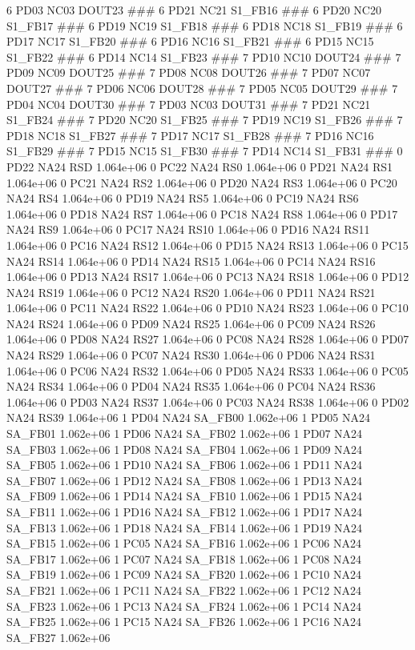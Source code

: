 6 PD03 NC03 DOUT23 ### 
6 PD21 NC21 S1_FB16 ### 
6 PD20 NC20 S1_FB17 ### 
6 PD19 NC19 S1_FB18 ### 
6 PD18 NC18 S1_FB19 ### 
6 PD17 NC17 S1_FB20 ### 
6 PD16 NC16 S1_FB21 ### 
6 PD15 NC15 S1_FB22 ### 
6 PD14 NC14 S1_FB23 ### 
7 PD10 NC10 DOUT24 ### 
7 PD09 NC09 DOUT25 ### 
7 PD08 NC08 DOUT26 ### 
7 PD07 NC07 DOUT27 ### 
7 PD06 NC06 DOUT28 ### 
7 PD05 NC05 DOUT29 ### 
7 PD04 NC04 DOUT30 ### 
7 PD03 NC03 DOUT31 ### 
7 PD21 NC21 S1_FB24 ### 
7 PD20 NC20 S1_FB25 ### 
7 PD19 NC19 S1_FB26 ### 
7 PD18 NC18 S1_FB27 ### 
7 PD17 NC17 S1_FB28 ### 
7 PD16 NC16 S1_FB29 ### 
7 PD15 NC15 S1_FB30 ### 
7 PD14 NC14 S1_FB31 ### 
0 PD22 NA24 RSD 1.064e+06 
0 PC22 NA24 RS0 1.064e+06 
0 PD21 NA24 RS1 1.064e+06 
0 PC21 NA24 RS2 1.064e+06 
0 PD20 NA24 RS3 1.064e+06 
0 PC20 NA24 RS4 1.064e+06 
0 PD19 NA24 RS5 1.064e+06 
0 PC19 NA24 RS6 1.064e+06 
0 PD18 NA24 RS7 1.064e+06 
0 PC18 NA24 RS8 1.064e+06 
0 PD17 NA24 RS9 1.064e+06 
0 PC17 NA24 RS10 1.064e+06 
0 PD16 NA24 RS11 1.064e+06 
0 PC16 NA24 RS12 1.064e+06 
0 PD15 NA24 RS13 1.064e+06 
0 PC15 NA24 RS14 1.064e+06 
0 PD14 NA24 RS15 1.064e+06 
0 PC14 NA24 RS16 1.064e+06 
0 PD13 NA24 RS17 1.064e+06 
0 PC13 NA24 RS18 1.064e+06 
0 PD12 NA24 RS19 1.064e+06 
0 PC12 NA24 RS20 1.064e+06 
0 PD11 NA24 RS21 1.064e+06 
0 PC11 NA24 RS22 1.064e+06 
0 PD10 NA24 RS23 1.064e+06 
0 PC10 NA24 RS24 1.064e+06 
0 PD09 NA24 RS25 1.064e+06 
0 PC09 NA24 RS26 1.064e+06 
0 PD08 NA24 RS27 1.064e+06 
0 PC08 NA24 RS28 1.064e+06 
0 PD07 NA24 RS29 1.064e+06 
0 PC07 NA24 RS30 1.064e+06 
0 PD06 NA24 RS31 1.064e+06 
0 PC06 NA24 RS32 1.064e+06 
0 PD05 NA24 RS33 1.064e+06 
0 PC05 NA24 RS34 1.064e+06 
0 PD04 NA24 RS35 1.064e+06 
0 PC04 NA24 RS36 1.064e+06 
0 PD03 NA24 RS37 1.064e+06 
0 PC03 NA24 RS38 1.064e+06 
0 PD02 NA24 RS39 1.064e+06 
1 PD04 NA24 SA_FB00 1.062e+06 
1 PD05 NA24 SA_FB01 1.062e+06 
1 PD06 NA24 SA_FB02 1.062e+06 
1 PD07 NA24 SA_FB03 1.062e+06 
1 PD08 NA24 SA_FB04 1.062e+06 
1 PD09 NA24 SA_FB05 1.062e+06 
1 PD10 NA24 SA_FB06 1.062e+06 
1 PD11 NA24 SA_FB07 1.062e+06 
1 PD12 NA24 SA_FB08 1.062e+06 
1 PD13 NA24 SA_FB09 1.062e+06 
1 PD14 NA24 SA_FB10 1.062e+06 
1 PD15 NA24 SA_FB11 1.062e+06 
1 PD16 NA24 SA_FB12 1.062e+06 
1 PD17 NA24 SA_FB13 1.062e+06 
1 PD18 NA24 SA_FB14 1.062e+06 
1 PD19 NA24 SA_FB15 1.062e+06 
1 PC05 NA24 SA_FB16 1.062e+06 
1 PC06 NA24 SA_FB17 1.062e+06 
1 PC07 NA24 SA_FB18 1.062e+06 
1 PC08 NA24 SA_FB19 1.062e+06 
1 PC09 NA24 SA_FB20 1.062e+06 
1 PC10 NA24 SA_FB21 1.062e+06 
1 PC11 NA24 SA_FB22 1.062e+06 
1 PC12 NA24 SA_FB23 1.062e+06 
1 PC13 NA24 SA_FB24 1.062e+06 
1 PC14 NA24 SA_FB25 1.062e+06 
1 PC15 NA24 SA_FB26 1.062e+06 
1 PC16 NA24 SA_FB27 1.062e+06 
